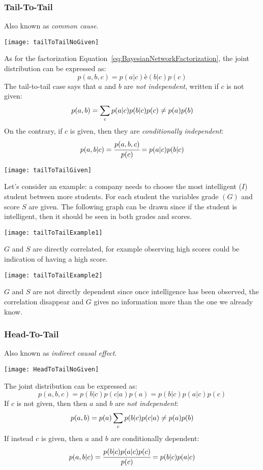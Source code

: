 \subsubsection{Tail-To-Tail}
Also known as \textit{common cause}.
\begin{center}
	\texttt{[image: tailToTailNoGiven]}
\end{center}
As for the factorization Equation~\ref{eq:BayesianNetworkFactorization}, the joint distribution can be expressed as:
\[
	p(a,b,c)=p(a\vert c)è(b\vert c)p(c)
\]
The tail-to-tail case says that $a$ and $b$ are \textit{not independent}, written %
if $c$ is not given:
\[
	p(a,b)=\displaystyle\sum_cp(a\vert c)p(b\vert c)p(c)\neq p(a)p(b)
\] 
On the contrary, if $c$ is given, then they are \textit{conditionally independent}:
\[
p(a,b\vert c)=\cfrac{p(a,b,c)}{p(c)}=p(a\vert c)p(b\vert c)
\] 
\begin{center}
	\texttt{[image: tailToTailGiven]}
\end{center}
Let's consider an example: a company needs to choose the most intelligent ($I$) student between more students. For each student the variables grade $(G)$ and score $S$ are given. The following graph can be drawn since if the student is intelligent, then it should be seen in both grades and scores. \newline
\begin{minipage}[htp]{\linewidth}
	\begin{minipage}[t]{0.48\linewidth}
		\begin{center}
			\texttt{[image: tailToTailExample1]}
		\end{center}
		$G$ and $S$ are directly correlated, for example observing high scores could be indication of having a high score. 
	\end{minipage}
	\hspace{0.04\linewidth}
	\begin{minipage}[t]{0.48\linewidth}
		\begin{center}
			\texttt{[image: tailToTailExample2]}
		\end{center}
		$G$ and $S$ are not directly dependent since once intelligence has been observed, the correlation disappear and $G$ gives no information more than the one we already know. 
	\end{minipage}
\end{minipage}
%
\subsubsection{Head-To-Tail}
Also known as \textit{indirect causal effect}.
\begin{center}
	\texttt{[image: HeadToTailNoGiven]}
\end{center}
The joint distribution can be expressed as:
\[
p(a,b,c)=p(b\vert c)p(c\vert a)p(a)=p(b\vert c)p(a\vert c)p(c)
\]
If $c$ is not given, then then $a$ and $b$ are \textit{not independent}:
\[
p(a,b)=p(a)\displaystyle\sum_cp(b\vert c)p(c\vert a)\neq p(a)p(b)
\]
If instead $c$ is given, then $a$ and $b$ are conditionally dependent:
\[
p(a,b\vert c)=\cfrac{p(b\vert c)p(a\vert c)p(c)}{p(c)}=p(b\vert c)p(a\vert c)
\]

